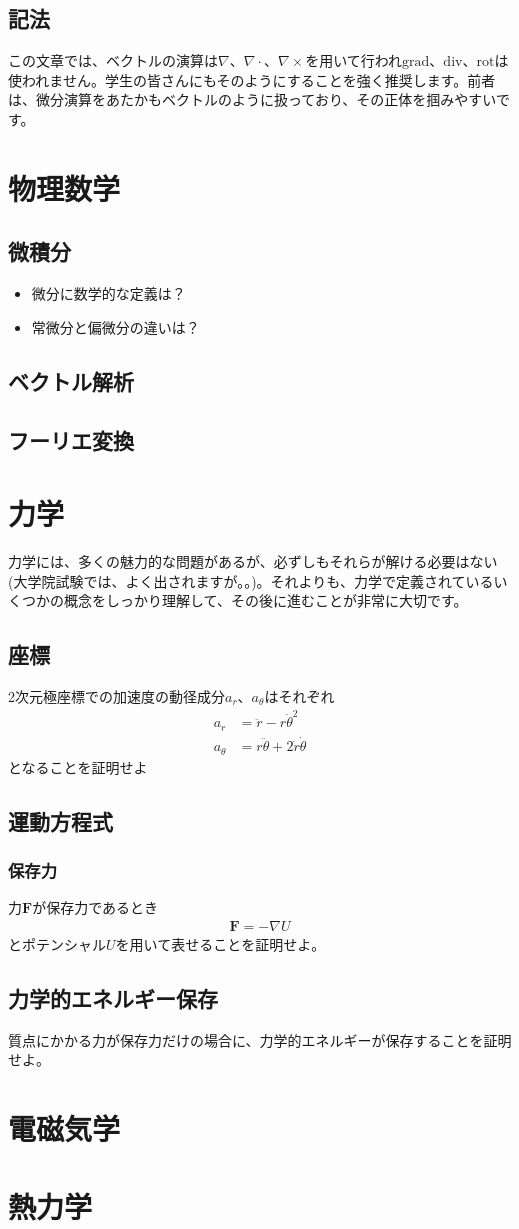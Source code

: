 \documentclass{ltjarticle}
\begin{document}
\subsection{記法}
この文章では、ベクトルの演算は$\nabla$、$\nabla\cdot$、$\nabla\times$を用いて行われ$\mathrm{grad}$、$\mathrm{div}$、$\mathrm{rot}$は使われません。学生の皆さんにもそのようにすることを強く推奨します。前者は、微分演算をあたかもベクトルのように扱っており、その正体を掴みやすいです。

\section{物理数学}
\subsection{微積分}
\begin{itemize}
    \item 微分に数学的な定義は？
    \item 常微分と偏微分の違いは？
\end{itemize}
\subsection{ベクトル解析}
\subsection{フーリエ変換}
\section{力学}
力学には、多くの魅力的な問題があるが、必ずしもそれらが解ける必要はない(大学院試験では、よく出されますが。。)。それよりも、力学で定義されているいくつかの概念をしっかり理解して、その後に進むことが非常に大切です。
\subsection{座標}
2次元極座標での加速度の動径成分$a_r$、$a_\theta$はそれぞれ
\begin{align}
    a_r &= \ddot{r} - r\dot{\theta}^2 \\
    a_\theta &= r\ddot{\theta} + 2\dot{r}\dot{\theta}
\end{align}
となることを証明せよ
\subsection{運動方程式}
\subsubsection{保存力}
力$\bm{F}$が保存力であるとき
\begin{align}
    \bm{F} = - \nabla U
\end{align}
とポテンシャル$U$を用いて表せることを証明せよ。
\subsection{力学的エネルギー保存}
質点にかかる力が保存力だけの場合に、力学的エネルギーが保存することを証明せよ。

\section{電磁気学}
\section{熱力学}
\end{document}

